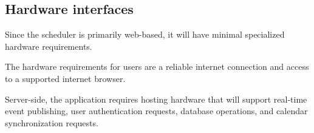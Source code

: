 \subsection{Hardware interfaces}

Since the scheduler is primarily web-based, it will have minimal specialized
hardware requirements.

The hardware requirements for users are a reliable internet connection and
access to a supported internet browser.

Server-side, the application requires hosting hardware that will support
real-time event publishing, user authentication requests, database operations,
and calendar synchronization requests.
